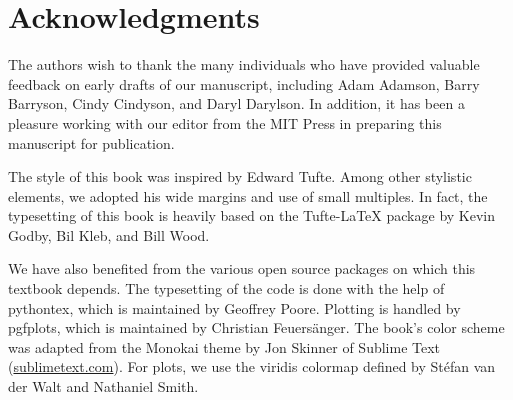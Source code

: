 \chapter*{Acknowledgments}

The authors wish to thank the many individuals who have provided valuable feedback on early drafts of our manuscript, including
Adam Adamson,
Barry Barryson,
Cindy Cindyson, and
Daryl Darylson.
In addition, it has been a pleasure working with our editor from the MIT Press in preparing this manuscript for publication.

The style of this book was inspired by Edward Tufte.
Among other stylistic elements, we adopted his wide margins and use of small multiples.
In fact, the typesetting of this book is heavily based on the Tufte-LaTeX package by Kevin Godby, Bil Kleb, and Bill Wood.

We have also benefited from the various open source packages on which this textbook depends.
The typesetting of the code is done with the help of pythontex, which is maintained by Geoffrey Poore.
Plotting is handled by pgfplots, which is maintained by Christian Feuers\"{a}nger.
The book's color scheme was adapted from the Monokai theme by Jon Skinner of Sublime Text (\url{sublimetext.com}).
For plots, we use the viridis colormap defined by St\'efan van der Walt and Nathaniel Smith.
